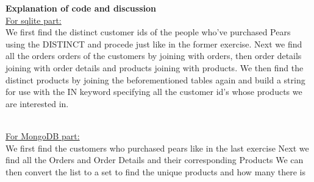 \documentclass{article}
\begin{document}
\textbf{Explanation of code and discussion}\\
\underline{For sqlite part:}~\\
We first find the distinct customer ids of the people who've purchased Pears using the DISTINCT and procede just like in the former exercise.
Next we find all the orders orders of the customers by joining with orders, then order details joining with order details and products joining with products.
We then find the distinct products by joining the beforementioned tables again and
build a string for use with the IN keyword specifying all the customer id's whose products we are interested in.

~\\
\underline{For MongoDB part:}~\\
We first find the customers who purchased pears like in the last exercise
Next we find all the Orders and Order Details and their corresponding Products
We can then convert the list to a set to find the unique products and how many there is
\end{document}
